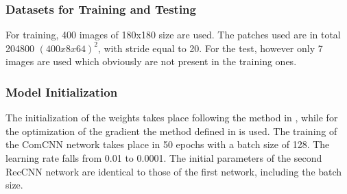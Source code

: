 \subsubsection{Datasets for Training and Testing}
For training, 400 images of 180x180 size are used. The patches used are in 
total 204800 $ (400x8x64)^2 $, with stride equal to 20. For the test, however only 
7 images are used which obviously are not present in the training ones.

\subsubsection{Model Initialization}
The initialization of the weights takes place following the method in \cite{0799924140}, 
while for the optimization of the gradient the method defined in \cite{0799924121} is used.
The training of the ComCNN network takes place in 50 epochs with a batch 
size of 128. The learning rate falls from 0.01 to 0.0001. The initial parameters 
of the second RecCNN network are identical to those of the first network, 
including the batch size.

